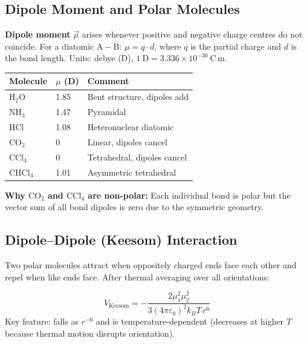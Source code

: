 \documentclass[12pt,a4paper]{article}
\begin{document}
\subsection{Dipole Moment and Polar Molecules}

\begin{tcolorbox}[defbox]
\textbf{Dipole moment} $\vec{\mu}$ arises whenever positive and negative charge centres do not coincide. For a diatomic $\mathrm{A{-}B}$: $\mu = q\cdot d$, where $q$ is the partial charge and $d$ is the bond length. Units: debye (D), $1\ \mathrm{D}=3.336\times10^{-30}\ \mathrm{C\,m}$.
\end{tcolorbox}

\begin{tabularx}{\linewidth}{|B{2.6cm}|Y|Y|}
\hline
\textbf{Molecule} & \textbf{$\mu$ (D)} & \textbf{Comment} \\
\hline
$\mathrm{H_2O}$ & 1.85 & Bent structure, dipoles add \\
\hline
$\mathrm{NH_3}$ & 1.47 & Pyramidal \\
\hline
$\mathrm{HCl}$ & 1.08 & Heteronuclear diatomic \\
\hline
$\mathrm{CO_2}$ & 0 & Linear, dipoles cancel \\
\hline
$\mathrm{CCl_4}$ & 0 & Tetrahedral, dipoles cancel \\
\hline
$\mathrm{CHCl_3}$ & 1.01 & Asymmetric tetrahedral \\
\hline
\end{tabularx}

\textbf{Why $\mathrm{CO_2}$ and $\mathrm{CCl_4}$ are non-polar:} Each individual bond is polar but the vector sum of all bond dipoles is zero due to the symmetric geometry.

\subsection{Dipole--Dipole (Keesom) Interaction}
Two polar molecules attract when oppositely charged ends face each other and repel when like ends face. After thermal averaging over all orientations:

\begin{tcolorbox}[formulabox, title={Keesom Orientational Energy (Thermal Average)}]
\[
V_{\mathrm{Keesom}} = -\frac{2\mu_1^2\mu_2^2}{3(4\pi\varepsilon_0)^2 k_B T\,r^6}
\]
Key feature: falls as $r^{-6}$ and is temperature-dependent (decreases at higher $T$ because thermal motion disrupts orientation).
\end{tcolorbox}
\end{document}
